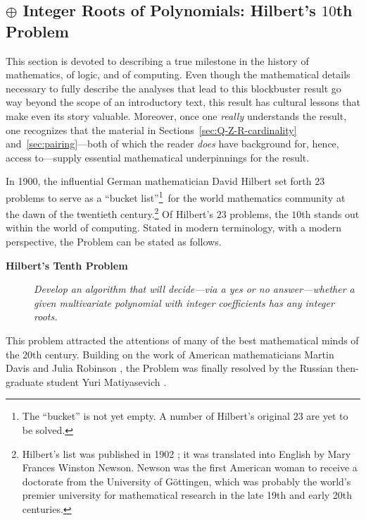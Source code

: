 \subsection{$\oplus$ Integer Roots of Polynomials: Hilbert's $10$th Problem}
\label{sec:Hilberts-Tenth}

This section is devoted to describing a true milestone in the history
of mathematics, of logic, and of computing.  Even though the
mathematical details necessary to fully describe the analyses that
lead to this blockbuster result go way beyond the scope of an
introductory text, this result has cultural lessons that make even its
story valuable.  Moreover, once one {\em really} understands the
result, one recognizes that the material in
Sections~\ref{sec:Q-Z-R-cardinality} and~\ref{sec:pairing}---both of
which the reader {\em does} have background for, hence, access
to---supply essential mathematical underpinnings for the result.

In 1900, the influential German mathematician David Hilbert
 set forth $23$ problems to serve as a ``bucket
list''\footnote{The ``bucket'' is not yet empty.  A number of
  Hilbert's original $23$ are yet to be solved.}~for the world
mathematics community at the dawn of the twentieth
century.\footnote{Hilbert's list was published in 1902
  \cite{Hilbert02}; it was translated into English by Mary Frances
  Winston Newson.  Newson was the
  first American woman to receive a doctorate from the University of
  G\"{o}ttingen, which was probably the world's premier university for
  mathematical research in the late 19th and early 20th centuries.}
Of Hilbert's $23$ problems, the $10$th stands out within the world of
computing.  Stated in modern
terminology, with a modern perspective, the Problem can be stated as
follows.
\begin{description}
\item[{\bf Hilbert's Tenth Problem}]
{\it Develop an algorithm that will decide---via a {\sc yes} or {\sc
    no} answer---whether a given multivariate polynomial with integer
  coefficients has any integer roots.  }
\end{description}
This problem attracted the attentions of many of the best mathematical
minds of the $20$th century.  Building on the work of American
mathematicians Martin Davis  and Julia Robinson
, the Problem was finally resolved by the Russian
then-graduate student Yuri Matiyasevich .

